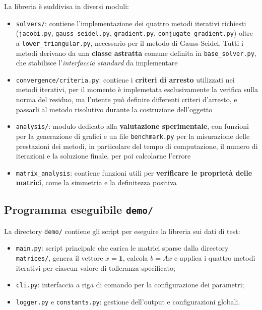 La libreria è suddivisa in diversi moduli:

\begin{itemize}
    \item \texttt{solvers/}: contiene l’implementazione dei quattro metodi iterativi richiesti (\texttt{jacobi.py}, \texttt{gauss\_seidel.py}, \texttt{gradient.py}, \texttt{conjugate\_gradient.py}) oltre a \texttt{lower\_triangular.py}, necessario per il metodo di Gauss-Seidel. Tutti i metodi derivano da una \textbf{classe astratta} comune definita in \texttt{base\_solver.py}, che stabilisce l’\textit{interfaccia standard} da implementare
    
    \item \texttt{convergence/criteria.py}: contiene i \textbf{criteri di arresto} utilizzati nei metodi iterativi, per il momento è implemetata esclusivamente la verifica sulla norma del residuo, ma l'utente può definire differenti criteri d'arresto, e passarli al metodo risolutivo durante la costruzione dell'oggetto

    \item \texttt{analysis/}: modulo dedicato alla \textbf{valutazione sperimentale}, con funzioni per la generazione  di grafici e un file \texttt{benchmark.py} per la misurazione delle prestazioni dei metodi, in particolare del tempo di computazione, il numero di iterazioni e la soluzione finale, per poi calcolarne l'errore

    \item \texttt{matrix\_analysis}: contiene funzioni utili per \textbf{verificare le proprietà delle matrici}, come la simmetria e la definitezza positiva
\end{itemize}

\subsection{Programma eseguibile \texttt{demo/}}

La directory \texttt{demo/} contiene gli script per eseguire la libreria sui dati di test:

\begin{itemize}
    \item \texttt{main.py}: script principale che carica le matrici sparse dalla directory \texttt{matrices/}, genera il vettore \( x = \mathbf{1} \), calcola \( b = Ax \) e applica i quattro metodi iterativi per ciascun valore di tolleranza specificato;
    
    \item \texttt{cli.py}: interfaccia a riga di comando per la configurazione dei parametri;
    
    \item \texttt{logger.py} e \texttt{constants.py}: gestione dell’output e configurazioni globali.
\end{itemize}



